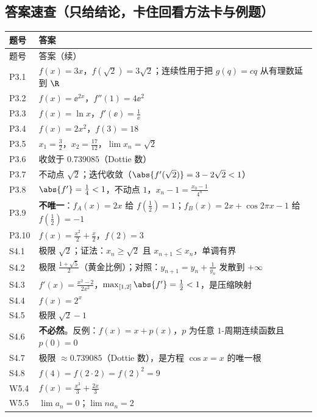 \documentclass[11pt,a4paper]{ctexart}
\begin{document}
\subsection{答案速查（只给结论，卡住回看方法卡与例题）}
{\footnotesize
\begin{longtable}{@{}p{1.6cm}p{13.0cm}@{}}
\toprule 题号 & 答案 \\ \midrule
\endfirsthead
\toprule 题号 & 答案（续） \\ \midrule
\endhead
\midrule
\endfoot
\bottomrule
\endlastfoot
P3.1 & $f(x)=3x$，$f(\sqrt{2})=3\sqrt{2}$；连续性用于把 $g(q)=cq$ 从有理数延到 $\R$ \\
P3.2 & $f(x)=\ee^{2x}$，$f''(1)=4\ee^{2}$ \\
P3.3 & $f(x)=\ln x$，$f'(\ee)=\frac{1}{\ee}$ \\
P3.4 & $f(x)=2x^{2}$，$f(3)=18$ \\
P3.5 & $x_{1}=\frac{3}{2}$，$x_{2}=\frac{17}{12}$，$\lim x_{n}=\sqrt{2}$ \\
P3.6 & 收敛于 $0.739085$（Dottie 数） \\
P3.7 & 不动点 $\sqrt{2}$；迭代收敛（$\abs{f'(\sqrt{2})}=3-2\sqrt{2}<1$） \\
P3.8 & $\abs{f'}=\frac{1}{4}<1$，不动点 $1$，$x_{n}-1=\frac{x_{0}-1}{4^{n}}$ \\
P3.9 & \textbf{不唯一}：$f_{A}(x)=2x$ 给 $f(\frac{1}{2})=1$；$f_{B}(x)=2x+\cos 2\pi x-1$ 给 $f(\frac{1}{2})=-1$ \\
P3.10 & $f(x)=\frac{x^{2}}{2}+\frac{x}{2}$，$f(2)=3$ \\
S4.1 & 极限 $\sqrt2$；证法：$x_{n}\geq\sqrt2$ 且 $x_{n+1}\leq x_{n}$，单调有界 \\
S4.2 & 极限 $\frac{1+\sqrt5}{2}$（黄金比例）；对照：$y_{n+1}=y_{n}+\frac1{y_{n}}$ 发散到 $+\infty$ \\
S4.3 & $f'(x)=\frac{x^{2}-2}{2x^{2}}$，$\max_{[1,2]}\abs{f'}=\frac12<1$，是压缩映射 \\
S4.4 & $f(x)=2^{x}$ \\
S4.5 & 极限 $\sqrt2-1$ \\
S4.6 & \textbf{不必然}。反例：$f(x)=x+p(x)$，$p$ 为任意 $1$-周期连续函数且 $p(0)=0$ \\
S4.7 & 极限 $\approx0.739085$（Dottie 数），是方程 $\cos x=x$ 的唯一根 \\
S4.8 & $f(4)=f(2\cdot2)=f(2)^{2}=9$ \\
W5.4 & $f(x)=\frac{x^3}{3}+\frac{2x}{3}$ \\
W5.5 & $\lim a_n=0$；$\lim n a_n=2$
\end{longtable}}
\end{document}
